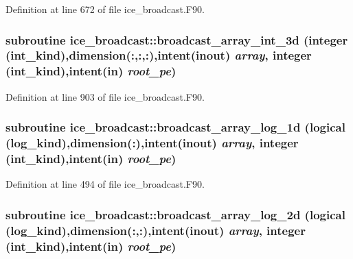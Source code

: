 Definition at line 672 of file ice\_\-broadcast.F90.\hypertarget{namespaceice__broadcast_a54da6a1350f99173ecc9afbdad4230b0}{
\subsubsection[{broadcast\_\-array\_\-int\_\-3d}]{\setlength{\rightskip}{0pt plus 5cm}subroutine ice\_\-broadcast::broadcast\_\-array\_\-int\_\-3d (integer (int\_\-kind),dimension(:,:,:),intent(inout) {\em array}, \/  integer (int\_\-kind),intent(in) {\em root\_\-pe})}}
\label{namespaceice__broadcast_a54da6a1350f99173ecc9afbdad4230b0}


Definition at line 903 of file ice\_\-broadcast.F90.\hypertarget{namespaceice__broadcast_a74b3384660f377db70f24bfc4ef599d8}{
\subsubsection[{broadcast\_\-array\_\-log\_\-1d}]{\setlength{\rightskip}{0pt plus 5cm}subroutine ice\_\-broadcast::broadcast\_\-array\_\-log\_\-1d (logical (log\_\-kind),dimension(:),intent(inout) {\em array}, \/  integer (int\_\-kind),intent(in) {\em root\_\-pe})}}
\label{namespaceice__broadcast_a74b3384660f377db70f24bfc4ef599d8}


Definition at line 494 of file ice\_\-broadcast.F90.\hypertarget{namespaceice__broadcast_adb50d2bd8cebc4b5529e8120f903b119}{
\subsubsection[{broadcast\_\-array\_\-log\_\-2d}]{\setlength{\rightskip}{0pt plus 5cm}subroutine ice\_\-broadcast::broadcast\_\-array\_\-log\_\-2d (logical (log\_\-kind),dimension(:,:),intent(inout) {\em array}, \/  integer (int\_\-kind),intent(in) {\em root\_\-pe})}}
\label{namespaceice__broadcast_adb50d2bd8cebc4b5529e8120f903b119}


